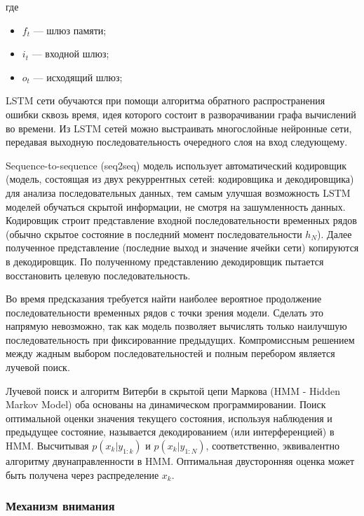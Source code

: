где

\begin{itemize}[leftmargin=1.6\parindent]
    \item[] ${f_{t}}$ --- шлюз памяти; 
	\item[] ${i_{t}}$ --- входной шлюз;
	\item[] ${o_{t}}$ --- исходящий шлюз;
\end{itemize}

\par LSTM сети обучаются при помощи алгоритма обратного распространения ошибки сквозь время, идея которого состоит в разворачивании графа вычислений во времени. Из LSTM сетей можно выстраивать многослойные нейронные сети, передавая выходную последовательность очередного слоя на вход
следующему.

\par Sequence-to-sequence (seq2seq) модель использует автоматический кодировщик (модель, состоящая из двух рекуррентных сетей: кодировщика и декодировщика) для анализа последовательных данных, тем самым улучшая возможность LSTM моделей обучаться скрытой информации, не смотря на зашумленность данных. Кодировщик строит представление входной последовательности временных рядов (обычно скрытое состояние в последний момент последовательности \(h_{N}\)). Далее полученное представление (последние выход и значение ячейки сети) копируются в декодировщик. По полученному представлению декодировщик пытается восстановить целевую последовательность. 

\par Во время предсказания требуется найти наиболее вероятное продолжение последовательности временных рядов с точки зрения модели. Сделать это напрямую невозможно, так как модель позволяет вычислять только наилучшую последовательность при фиксированние предыдущих. Компромиссным решением между жадным выбором последовательностей и полным перебором является лучевой поиск. 

\par Лучевой поиск и алгоритм Витерби в скрытой цепи Маркова (HMM - Hidden Markov Model) оба основаны на динамическом программировании. Поиск оптимальной оценки значения текущего состояния, используя наблюдения и предыдущее состояние, называется декодированием (или интерференцией) в HMM. Высчитывая \(p(x_{k}|y_{1:k})\) и \(p(x_{k}|y_{1:N})\), соответственно, эквивалентно алгоритму двунаправленности в HMM. Оптимальная двусторонняя оценка может быть получена через распределение \(x_{k}\). 

\subsubsection{Механизм внимания}

